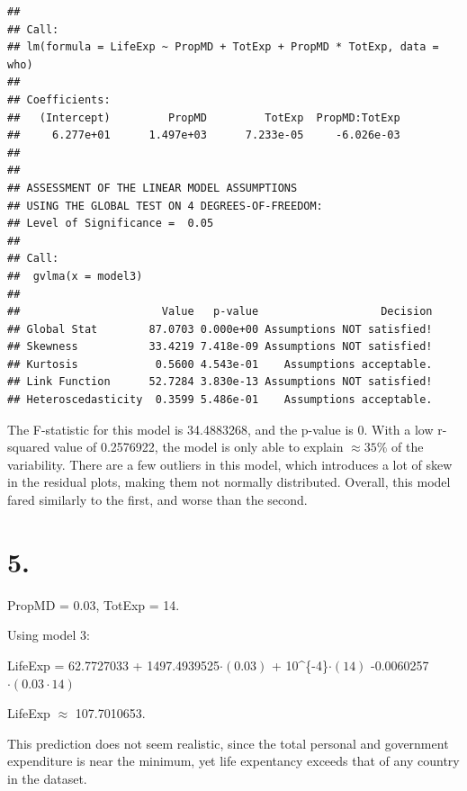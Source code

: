 \documentclass[]{article}
\begin{document}
\begin{verbatim}
## 
## Call:
## lm(formula = LifeExp ~ PropMD + TotExp + PropMD * TotExp, data = who)
## 
## Coefficients:
##   (Intercept)         PropMD         TotExp  PropMD:TotExp  
##     6.277e+01      1.497e+03      7.233e-05     -6.026e-03  
## 
## 
## ASSESSMENT OF THE LINEAR MODEL ASSUMPTIONS
## USING THE GLOBAL TEST ON 4 DEGREES-OF-FREEDOM:
## Level of Significance =  0.05 
## 
## Call:
##  gvlma(x = model3) 
## 
##                      Value   p-value                   Decision
## Global Stat        87.0703 0.000e+00 Assumptions NOT satisfied!
## Skewness           33.4219 7.418e-09 Assumptions NOT satisfied!
## Kurtosis            0.5600 4.543e-01    Assumptions acceptable.
## Link Function      52.7284 3.830e-13 Assumptions NOT satisfied!
## Heteroscedasticity  0.3599 5.486e-01    Assumptions acceptable.
\end{verbatim}

The F-statistic for this model is 34.4883268, and the p-value is \(0\).
With a low r-squared value of 0.2576922, the model is only able to
explain \(\approx 35\%\) of the variability. There are a few outliers in
this model, which introduces a lot of skew in the residual plots, making
them not normally distributed. Overall, this model fared similarly to
the first, and worse than the second.

\section{5.}\label{section-6}

PropMD = 0.03, TotExp = 14.

Using model 3:

LifeExp = 62.7727033 + 1497.4939525\(\cdot (0.03)\) +
10\^{}\{-4\}\(\cdot (14)\) -0.0060257\(\cdot (0.03 \cdot 14)\)

LifeExp \(\approx\) 107.7010653.

This prediction does not seem realistic, since the total personal and
government expenditure is near the minimum, yet life expentancy exceeds
that of any country in the dataset.
\end{document}
